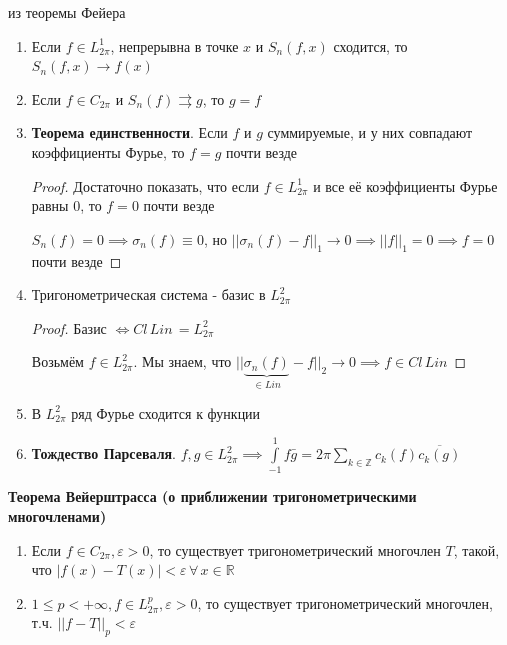 \begin{consequence}
    из теоремы Фейера
    \begin{enumerate}
        \item {
            Если $f \in L_{2\pi}^1$, непрерывна в точке $x$ и $S_n (f, x)$ сходится, то $S_n (f, x) \rightarrow f(x)$
        }
        \item {
            Если $f \in C_{2\pi}$ и $S_n (f) \rightrightarrows g$, то $g = f$
        }
        \item {
            \textbf{Теорема единственности}. Если $f$ и $g$ суммируемые, и у них совпадают коэффициенты Фурье, то $f = g$ почти везде

            \begin{proof}
                Достаточно показать, что если $f \in L_{2\pi}^1$ и все её коэффициенты Фурье равны 0, то $f = 0$ почти везде

                $S_n (f) = 0 \implies \sigma_n (f) \equiv 0$, но $|| \sigma_n (f) - f ||_1 \rightarrow 0 \implies ||f||_1 = 0 \implies f = 0$ почти везде
            \end{proof}
        }
        \item {
            Тригонометрическая система - базис в $L_{2\pi}^2$

            \begin{proof}
                Базис $\Leftrightarrow Cl \, Lin \, = L_{2\pi}^2$

                Возьмём $f \in L_{2\pi}^2$. Мы знаем, что $|| \underbrace{\sigma_n (f)}_{\in Lin} - f ||_2 \rightarrow 0 \implies f \in Cl \, Lin $
            \end{proof}
        }
        \item {
            В $L_{2\pi}^2$ ряд Фурье сходится к функции
        }
        \item {
            \textbf{Тождество Парсеваля}. $f, g \in L_{2\pi}^2 \implies \int\limits_{-1}^1 f \bar{g} = 2\pi \sum\limits_{k \in \mathbb{Z}} c_k (f) \overline{c_k (g)}$
        }
    \end{enumerate}
\end{consequence}

\begin{theorem}
    \textbf{Теорема Вейерштрасса (о приближении тригонометрическими многочленами)}

    \begin{enumerate}
        \item {
            Если $f \in C_{2\pi}, \varepsilon > 0$, то существует тригонометрический многочлен $T$, такой, что $|f(x) - T(x)| < \varepsilon \, \forall \, x \in \mathbb{R}$
        }
        \item {
            $1 \leqslant p < +\infty, f \in L_{2\pi}^p, \varepsilon > 0$, то существует тригонометрический многочлен, т.ч. $||f - T||_p < \varepsilon$
        }
    \end{enumerate}
\end{theorem}

